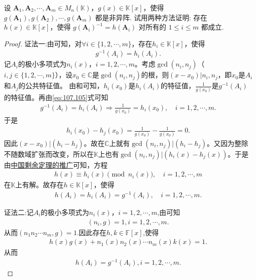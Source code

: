 \documentclass[../../main.tex]{subfiles}%
\begin{document}
\begin{example}
设 \( \boldsymbol{A}_1, \boldsymbol{A}_2, \cdots, \boldsymbol{A}_m \in M_n(\mathbb{K}) \)，\( g(x) \in \mathbb{K}[x] \)，使得 \( g(\boldsymbol{A}_1), g(\boldsymbol{A}_2), \cdots, g(\boldsymbol{A}_m) \) 都是非异阵. 试用两种方法证明: 存在 \( h(x) \in \mathbb{K}[x] \)，使得 \( g(\boldsymbol{A}_i)^{-1} = h(\boldsymbol{A}_i) \) 对所有的 \( 1 \leqslant i \leqslant m \) 都成立.
\end{example}
\begin{proof}

{\color{blue}证法一:}由可知，对\(\forall i\in \{1,2,\cdots ,m\}\)，存在\(h_i\in \mathbb{K}[x]\)，使得
\begin{align}
g^{-1}(A_i) = h_i(A_i). \label{eq:107.105}
\end{align}
记\(A_i\)的极小多项式为\(n_i(x)\)，\(i=1,2,\cdots,m\)。考虑\(\gcd(n_i,n_j)\)（\(i,j\in \{1,2,\cdots ,m\}\)），设\(x_0\in \mathbb{C}\)是\(\gcd(n_i,n_j)\)的根，则\((x-x_0)|n_i,n_j\)，即\(x_0\)是\(A_i\)和\(A_j\)的公共特征值。
由和可知，\(h_i(x_0)\)是\(h_i(A_i)\)的特征值，\(\frac{1}{g(x_0)}\)是\(g^{-1}(A_i)\)的特征值。再由\eqref{eq:107.105}式可知
\begin{align*}
g^{-1}(A_i) = h_i(A_i) \Longrightarrow \frac{1}{g(x_0)} = h_i(x_0),\quad i=1,2,\cdots,m.
\end{align*}
于是
\begin{align*}
h_i(x_0) - h_j(x_0) = \frac{1}{g(x_0)} - \frac{1}{g(x_0)} = 0.
\end{align*}
因此\((x-x_0)|(h_i - h_j)\)。故在\(\mathbb{C}\)上就有\(\gcd(n_i,n_j)|(h_i - h_j)\)。又因为整除不随数域扩张而改变，所以在\(\mathbb{K}\)上也有\(\gcd(n_i,n_j)|(h_i(x) - h_j(x))\)。于是由\hyperref[theorem:中国剩余定理推广(模不互质的情况)]{中国剩余定理的推广}可知，方程
\begin{align*}
h(x) \equiv h_i(x) \pmod{n_i(x)},\quad i=1,2,\cdots,m
\end{align*}
在\(\mathbb{K}\)上有解。故存在\(h\in \mathbb{K}[x]\)，使得
\begin{align*}
h(A_i) = h_i(A_i) = g^{-1}(A_i),\quad i=1,2,\cdots,m.
\end{align*}

{\color{blue}证法二:}记\(A_i\)的极小多项式为\(n_i(x)\)，\(i=1,2,\cdots,m\),由可知
\begin{align*}
(n_i,g)=1,i=1,2,\cdots,m.
\end{align*}
从而$\left( n_1n_2\cdots n_m,g \right) =1$.因此存在$h,k\in \mathbb{F}[x]$,使得
\begin{align*}
h\left( x \right) g\left( x \right) +n_1\left( x \right) n_2\left( x \right) \cdots n_m\left( x \right) k\left( x \right) =1.
\end{align*}
从而
\begin{align*}
h\left( A_i \right) =g^{-1}\left( A_i \right) ,i=1,2,\cdots ,m.
\end{align*}

\end{proof}
\end{document}
